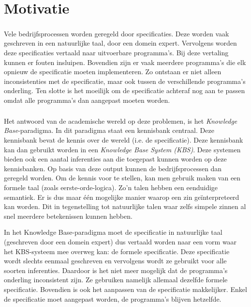 \chapter{Motivatie}

\paragraph{} Vele bedrijfsprocessen worden geregeld door specificaties. Deze worden vaak geschreven in een natuurlijke taal, door een domein expert. Vervolgens worden deze specificaties vertaald naar uitvoerbare programma's. Bij deze vertaling kunnen er fouten insluipen. Bovendien zijn er vaak meerdere programma's die elk opnieuw de specificatie moeten implementeren. Zo ontstaan er niet alleen inconsistenties met de specificatie, maar ook tussen de verschillende programma's onderling. Ten slotte is het moeilijk om de specificatie achteraf nog aan te passen omdat alle programma's dan aangepast moeten worden.

\paragraph{} Het antwoord van de academische wereld op deze problemen, is het \textit{Knowledge Base}-paradigma. In dit paradigma staat een kennisbank centraal. Deze kennisbank bevat de kennis over de wereld (i.e. de specificatie). Deze kennisbank kan dan gebruikt worden in een \textit{Knowledge Base System (KBS)}. Deze systemen bieden ook een aantal inferenties aan die toegepast kunnen worden op deze kennisbanken. Op basis van deze output kunnen de bedrijfsprocessen dan geregeld worden. Om de kennis voor te stellen, kan men gebruik maken van een formele taal (zoals eerste-orde-logica). Zo'n talen hebben een eenduidige semantiek. Er is dus maar één mogelijke manier waarop een zin geïnterpreteerd kan worden. Dit in tegenstelling tot natuurlijke talen waar zelfs simpele zinnen al snel meerdere betekenissen kunnen hebben.

In het Knowledge Base-paradigma moet de specificatie in natuurlijke taal (geschreven door een domein expert) dus vertaald worden naar een vorm waar het KBS-systeem mee overweg kan: de formele specificatie. Deze specificatie wordt slechts eenmaal geschreven en vervolgens wordt ze gebruikt voor alle soorten inferenties. Daardoor is het niet meer mogelijk dat de programma's onderling inconsistent zijn. Ze gebruiken namelijk allemaal dezelfde formele specificatie. Bovendien is ook het aanpassen van de specificatie makkelijker. Enkel de specificatie moet aangepast worden, de programma's blijven hetzelfde.

